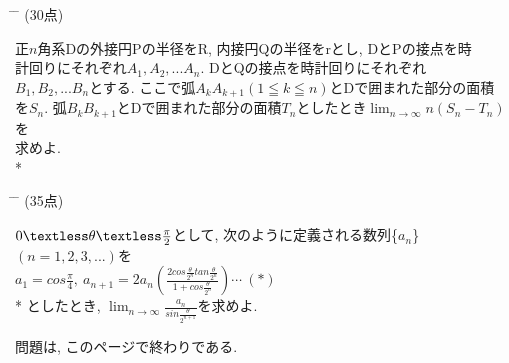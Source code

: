 \documentclass{article}
\begin{document}
\begin{tabbing}
\hspace{0.91\textwidth} \= \hspace{0.8\textwidth} \= \kill
\textsf{}\> (30点)\>\\
\end{tabbing}
正$n$角系Dの外接円Pの半径をR, 内接円Qの半径をrとし, DとPの接点を時\vspace{0.1in}\\
計回りにそれぞれ$A_1,A_2, ...A_n$. DとQの接点を時計回りにそれぞれ\vspace{0.1in}\\$B_1, B_2,...B_n$とする. ここで弧$A_kA_{k+1}(1\leqq k\leqq n)$とDで囲まれた部分の面積\vspace{0.1in}\\を$S_n$. 弧$B_kB_{k+1}$とDで囲まれた部分の面積$T_n$としたとき$\displaystyle \lim_{n\to \infty}n(S_n-T_n)$を\vspace{0.1in}\\求めよ.\vspace{1.1in}\\*

\begin{tabbing}
\hspace{0.91\textwidth} \= \hspace{0.8\textwidth} \= \kill
\textsf{}\> (35点)\>\\
\end{tabbing}
$0\textless \theta\textless \frac{\pi}{2}$として, 次のように定義される数列\{$a_n$\}\ $(n=1,2,3,...)$を\vspace{0.1in}\\
$a_1=cos{\frac{\pi}{4}},\ a_{n+1}=2a_n(\frac{2cos\frac{\theta}{2^n}tan\frac{\theta}{2^n}}{1+cos\frac{\theta}{2^n}}) \cdots \ (\ast)$\vspace{0.1in}\\*
としたとき, $\displaystyle \lim_{n \to \infty}\frac{a_n}{sin\frac{\theta}{2^{n+1}}}$を求めよ.\vspace{0.2in}\\
\begin{center}
{\Large 問題は, このページで終わりである.}\vspace{0.2in}\\
\end{center}
\hspace{2.14in}{\Large ---$2$---}\hspace{1.55in}{\scriptsize $\diamond$ M4(738---27)}
\end{document}
